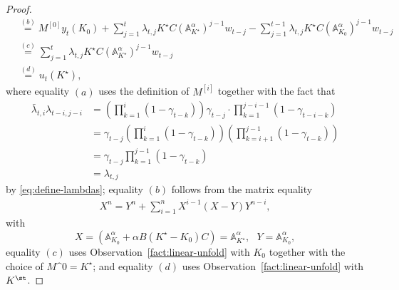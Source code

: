 \begin{proof}
\begin{align*}
&\overset{(b)}{=} M^{[0]}y_t(K_0)+\sum_{j=1}^{t}\lambda_{t,j}K^{\star}C(\mathbb{A}_{K^{\star}}^{\alpha})^{j-1}w_{t-j}-\sum_{j=1}^{t-1}\lambda_{t,j}K^{\star}C(\mathbb{A}_{K_{0}}^{\alpha})^{j-1}w_{t-j}\\
&\overset{(c)}{=} \sum_{j=1}^{t}\lambda_{t,j}K^{\star}C(\mathbb{A}_{K^{\star}}^{\alpha})^{j-1}w_{t-j}\\%
&\overset{(d)}{=}u_t(K^{\star}),
\end{align*}
where equality $(a)$ uses the definition of $M^{[i]}$ together with the fact that
\begin{align}
\label{eq:lambda-property}
\bar{\lambda}_{t,i}\lambda_{t-i, j-i}&=\left(\prod_{k=1}^i (1-\gamma_{t-k})\right)\gamma_{t-j}\cdot \prod_{k=1}^{j-i-1}(1-\gamma_{t-i-k}) \nonumber\\
&=\gamma_{t-j}\left(\prod_{k=1}^i (1-\gamma_{t-k})\right)\left(\prod_{k=i+1}^{j-1} (1-\gamma_{t-k})\right) \nonumber\\
&=\gamma_{t-j}\prod_{k=1}^{j-1}(1-\gamma_{t-k}) \nonumber\\
&=\lambda_{t,j}
\end{align}
by \cref{eq:define-lambdas}; equality $(b)$ follows from the matrix equality
\begin{align*}
X^n=Y^n+\sum_{i=1}^n X^{i-1}(X-Y)Y^{n-i},
\end{align*}
with 
\[X=(\mathbb{A}_{K_{0}}^{\alpha}+\alpha B(K^{\star}-K_0)C)=\mathbb{A}_{K^{\star}}^{\alpha}, \ \ \ Y=\mathbb{A}_{K_{0}}^{\alpha},\]
equality $(c)$ uses Observation~\ref{fact:linear-unfold} with $K_0$ together with the choice of $M\^0 = K^\star$; and equality $(d)$ uses Observation~\ref{fact:linear-unfold} with $K^\st$.


\end{proof}
